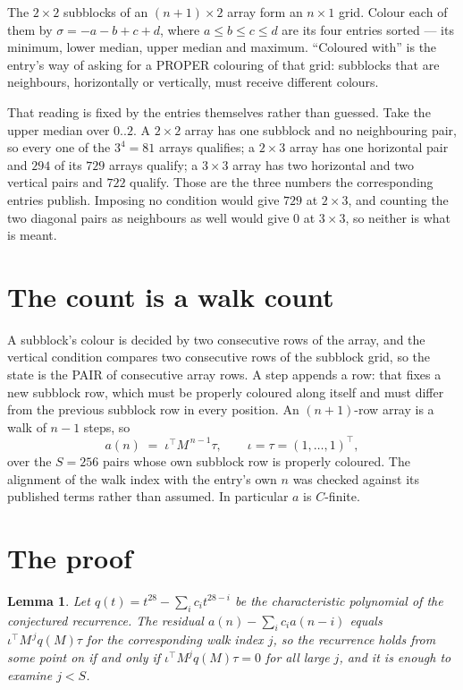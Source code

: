 \documentclass[11pt,a4paper]{article}
\theoremstyle{plain}
\newtheorem{lemma}[theorem]{Lemma}
\theoremstyle{definition}
\begin{document}
The $2\times2$ subblocks of an $(n+1)\times2$ array form an
$n\times1$ grid. Colour each of them by $\sigma=-a-b+c+d$, where $a\le b\le c\le d$ are its four entries sorted --- its minimum, lower median, upper median and maximum. ``Coloured with'' is the entry's way of
asking for a PROPER colouring of that grid: subblocks that are neighbours, horizontally or
vertically, must receive different colours.

That reading is fixed by the entries themselves rather than guessed. Take the upper median
over $0..2$. A $2\times2$ array has one subblock and no neighbouring pair, so every one of the
$3^4=81$ arrays qualifies; a $2\times3$ array has one horizontal pair and $294$ of its $729$
arrays qualify; a $3\times3$ array has two horizontal and two vertical pairs and $722$
qualify. Those are the three numbers the corresponding entries publish. Imposing no condition
would give $729$ at $2\times3$, and counting the two diagonal pairs as neighbours as well
would give $0$ at $3\times3$, so neither is what is meant.

\section{The count is a walk count}

A subblock's colour is decided by two consecutive rows of the array, and
the vertical condition compares two consecutive rows of the subblock grid, so the state is the
PAIR of consecutive array rows. A step appends a row: that fixes a new subblock row, which
must be properly coloured along itself and must differ from the previous subblock row in every
position. An $(n+1)$-row array is a walk of $n-1$ steps, so
\[
a(n)\;=\;\iota^{\!\top}M^{\,n-1}\tau,\qquad\iota=\tau=(1,\dots,1)^{\!\top},
\]
over the $S=256$ pairs whose own subblock row is properly coloured.
The alignment of the walk index with the entry's own $n$ was checked against its published
terms rather than assumed. In particular $a$ is $C$-finite.

\section{The proof}

\begin{lemma}\label{lem:crit}
Let $q(t)=t^{28}-\sum_i c_it^{28-i}$ be the characteristic polynomial of the
conjectured recurrence. The residual $a(n)-\sum_ic_ia(n-i)$ equals
$\iota^{\!\top}M^{\,j}q(M)\tau$ for the corresponding walk index $j$, so the recurrence
holds from some point on if and only if $\iota^{\!\top}M^{j}q(M)\tau=0$ for all large $j$,
and it is enough to examine $j<S$.
\end{lemma}
\end{document}
